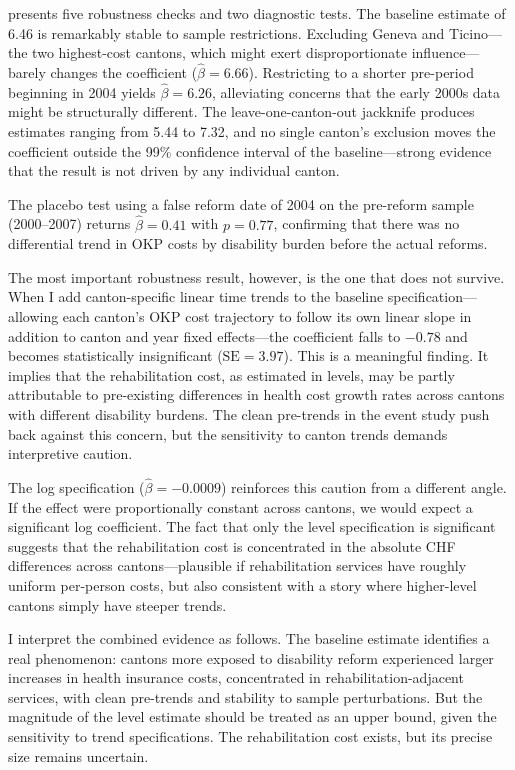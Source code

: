 \documentclass[12pt]{article}
\begin{document}


 presents five robustness checks and two diagnostic tests. The baseline estimate of 6.46 is remarkably stable to sample restrictions. Excluding Geneva and Ticino---the two highest-cost cantons, which might exert disproportionate influence---barely changes the coefficient ($\hat{\beta} = 6.66$). Restricting to a shorter pre-period beginning in 2004 yields $\hat{\beta} = 6.26$, alleviating concerns that the early 2000s data might be structurally different. The leave-one-canton-out jackknife produces estimates ranging from 5.44 to 7.32, and no single canton's exclusion moves the coefficient outside the 99\% confidence interval of the baseline---strong evidence that the result is not driven by any individual canton.

The placebo test using a false reform date of 2004 on the pre-reform sample (2000--2007) returns $\hat{\beta} = 0.41$ with $p = 0.77$, confirming that there was no differential trend in OKP costs by disability burden before the actual reforms.

The most important robustness result, however, is the one that does not survive. When I add canton-specific linear time trends to the baseline specification---allowing each canton's OKP cost trajectory to follow its own linear slope in addition to canton and year fixed effects---the coefficient falls to $-0.78$ and becomes statistically insignificant ($\text{SE} = 3.97$). This is a meaningful finding. It implies that the rehabilitation cost, as estimated in levels, may be partly attributable to pre-existing differences in health cost growth rates across cantons with different disability burdens. The clean pre-trends in the event study push back against this concern, but the sensitivity to canton trends demands interpretive caution.

The log specification ($\hat{\beta} = -0.0009$) reinforces this caution from a different angle. If the effect were proportionally constant across cantons, we would expect a significant log coefficient. The fact that only the level specification is significant suggests that the rehabilitation cost is concentrated in the absolute CHF differences across cantons---plausible if rehabilitation services have roughly uniform per-person costs, but also consistent with a story where higher-level cantons simply have steeper trends.

I interpret the combined evidence as follows. The baseline estimate identifies a real phenomenon: cantons more exposed to disability reform experienced larger increases in health insurance costs, concentrated in rehabilitation-adjacent services, with clean pre-trends and stability to sample perturbations. But the magnitude of the level estimate should be treated as an upper bound, given the sensitivity to trend specifications. The rehabilitation cost exists, but its precise size remains uncertain.
\end{document}
